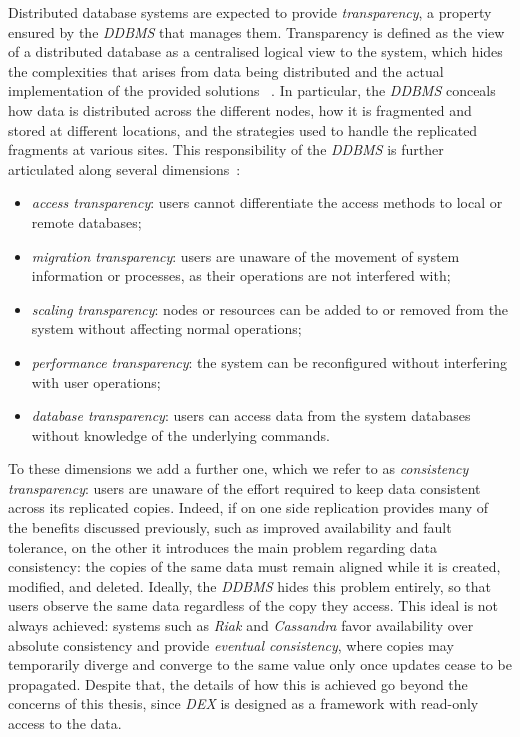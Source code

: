 Distributed database systems are expected to provide \textit{transparency}, a
property ensured by the \textit{DDBMS} that manages them. Transparency is
defined as the view of a distributed database as a centralised logical view to
the system, which hides the complexities that arises from data being distributed
and the actual implementation of the provided solutions
~\cite{coronel2016database}. In particular, the \textit{DDBMS} conceals how data
is distributed across the different nodes, how it is fragmented and stored at
different locations, and the strategies used to handle the replicated fragments
at various sites. This responsibility of the \textit{DDBMS} is further
articulated along several dimensions~\cite{vikiru2023overview}:
\begin{itemize}
      \item \textit{access transparency}: users cannot differentiate the
      access methods to local or remote databases;
      \item \textit{migration transparency}: users are unaware of the movement
      of system information or processes, as their operations are not
      interfered with;
      \item \textit{scaling transparency}: nodes or resources can be added to
      or removed from the system without affecting normal operations;
      \item \textit{performance transparency}: the system can be reconfigured
      without interfering with user operations;
      \item \textit{database transparency}: users can access data from the
      system databases without knowledge of the underlying commands.
\end{itemize}
To these dimensions we add a further one, which we refer to as
\textit{consistency transparency}: users are unaware of the effort required to
keep data consistent across its replicated copies. 
Indeed, if on one side replication provides many of the benefits discussed
previously, such as improved availability and fault tolerance, on the other it
introduces the main problem regarding data consistency: the copies of the same
data must remain aligned while it is created, modified, and deleted. Ideally,
the \textit{DDBMS} hides this problem entirely, so that users observe the same
data regardless of the copy they access. This ideal is not always achieved:
systems such as \textit{Riak} and \textit{Cassandra} favor availability over
absolute consistency and provide \textit{eventual consistency}, where copies may 
temporarily diverge and converge to the same value only once updates cease to
be propagated. Despite that, the details of how this is achieved go beyond the
concerns of this thesis, since \textit{DEX} is designed as a framework with
read-only access to the data.


